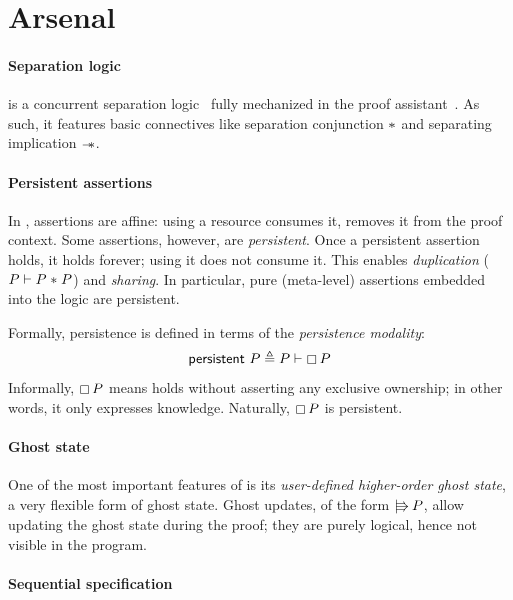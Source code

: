 \section{\Iris Arsenal}

\paragraph{Separation logic}

\Iris is a concurrent separation logic~\citep{DBLP:conf/csl/OHearnRY01,DBLP:conf/lics/Reynolds02,DBLP:journals/tcs/OHearn07} fully mechanized in the \Rocq proof assistant~\citep{DBLP:journals/pacmpl/KrebbersJ0TKTCD18}.
As such, it features basic connectives like separation conjunction $\mathrel{\ast}$ and separating implication $\mathrel{-\!\!\ast}$.

\paragraph{Persistent assertions}

In \Iris, assertions are affine: using a resource consumes it, removes it from the proof context.
Some assertions, however, are \emph{persistent}.
Once a persistent assertion holds, it holds forever; using it does not consume it.
This enables \emph{duplication} ($\iProp \iEntails \iProp \iSep \iProp$) and \emph{sharing}.
In particular, pure (meta-level) assertions embedded into the logic are persistent.

Formally, persistence is defined in terms of the \emph{persistence modality}:
\[
  \iPersistent{\iProp}
  \eqdef
  \iProp \iEntails \iPersistently \iProp
\]
Informally, $\iPersistently \iProp$ means \iProp holds without asserting any exclusive ownership; in other words, it only expresses knowledge.
Naturally, $\iPersistently \iProp$ is persistent.

\paragraph{Ghost state}

One of the most important features of \Iris is its \emph{user-defined higher-order ghost state}, a very flexible form of ghost state.
Ghost updates, of the form $\iFupd \iProp$, allow updating the ghost state during the proof; they are purely logical, hence not visible in the program.

\paragraph{Sequential specification}

